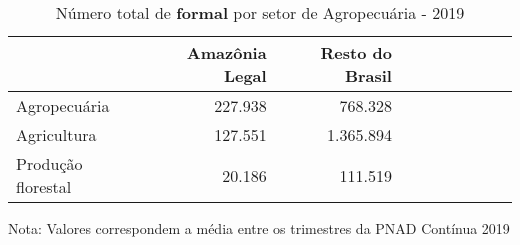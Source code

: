 \begin{table}[H]
\centering
\label{\_retrato\_emprego\_setor\_spap\_agricultura\_table\_n\_de\_formal}
\begin{threeparttable}
\caption{Número total de \textbf{formal} por setor de Agropecuária - 2019}
\begin{tabular}{l*{3}{rrr}}
\midrule \midrule
                    &Amazônia Legal&Resto do Brasil\\
\midrule
Agropecuária       &     227.938&     768.328\\
Agricultura         &     127.551&   1.365.894\\
Produção florestal&      20.186&     111.519\\
\bottomrule
\end{tabular}
\begin{tablenotes}
\scriptsize{Nota: Valores correspondem a média entre os trimestres da PNAD Contínua 2019}
\end{tablenotes}
\end{threeparttable}
\end{table}
